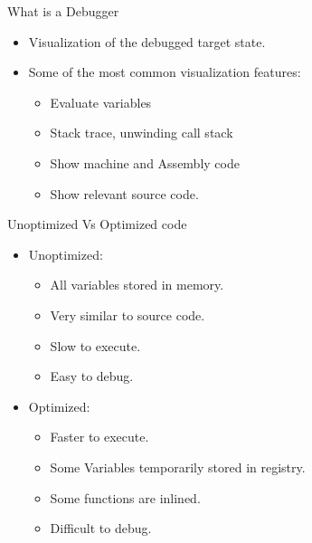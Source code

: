 
\begin{frame}{What is a Debugger}
    \begin{itemize}
        \item Visualization of the debugged target state.
        \item Some of the most common visualization features:
    	\begin{itemize}
    	    \item Evaluate variables
    	    \item Stack trace, unwinding call stack
    	    \item Show machine and Assembly code
    	    \item Show relevant source code.
    	\end{itemize}
    \end{itemize}
\end{frame}


\begin{frame}{Unoptimized Vs Optimized code}
    \begin{itemize}
        \item Unoptimized:
    	\begin{itemize}
    	    \item All variables stored in memory.
    	    \item Very similar to source code.
    	    \item Slow to execute.
    	    \item Easy to debug.
    	\end{itemize}
        \item Optimized:
    	\begin{itemize}
    	    \item Faster to execute.
    	    \item Some Variables temporarily stored in registry.
    	    \item Some functions are inlined.
    	    \item Difficult to debug.
    	\end{itemize}
    \end{itemize}
\end{frame}

